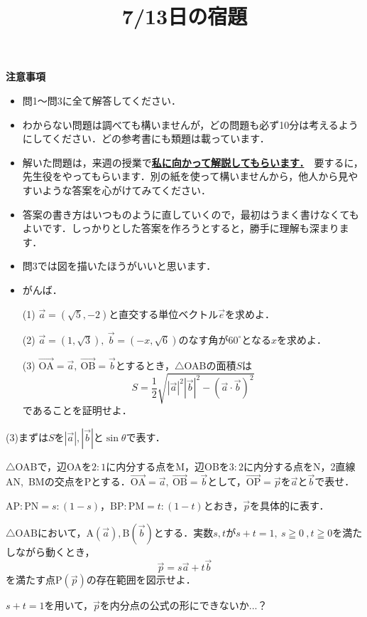 \documentclass[a4paper,11pt]{ltjarticle}
\title{}
\author{}
\date{}
\title{7/13日の宿題}
\author{}
\date{}
\begin{document}
\pagestyle{empty}
\maketitle
\centerline{\large{\textbf{注意事項}}}
\begin{itemize}
    \item 問1〜問3に全て解答してください．
    \item わからない問題は調べても構いませんが，どの問題も必ず10分は考えるようにしてください．どの参考書にも類題は載っています．
    \item 解いた問題は，来週の授業で\textbf{\underline{私に向かって解説してもらいます．}}　要するに，先生役をやってもらいます．別の紙を使って構いませんから，他人から見やすいような答案を心がけてみてください．
    \item 答案の書き方はいつものように直していくので，最初はうまく書けなくてもよいです．しっかりとした答案を作ろうとすると，勝手に理解も深まります．
    \item 問3では図を描いたほうがいいと思います．
    \item がんば．
\end{itemize}
\newpage
\begin{que}[：ベクトルの内積]
\begin{itemize}
    \item [(1)]$\overrightarrow{a}=(\sqrt5,-2)$と直交する単位ベクトル$\overrightarrow{e}$を求めよ．
     \item [(2)] $\overrightarrow{a}=(1,\sqrt3),~\overrightarrow{b}=(-x,\sqrt6)$のなす角が$60^\circ$となる$x$を求めよ．
     \item [(3)]$\overrightarrow{\mathrm{OA}}=\overrightarrow{a},~\overrightarrow{\mathrm{OB}}=\overrightarrow{b}$とするとき，$\triangle $OABの面積$S$は
     \[S=\frac12\sqrt{|\overrightarrow{a}|^2|\overrightarrow{b}|^2-(\overrightarrow{a}\cdot\overrightarrow{b})^2}\]
     であることを証明せよ．
\end{itemize}
\end{que}
(3)まずは$S$を$|\overrightarrow{a}|,|\overrightarrow{b}|$と$\sin\theta$で表す．
\ans
\newpage
\begin{que}[：点の存在範囲]
$\triangle$OABで，辺OAを$2:1$に内分する点をM，辺OBを$3:2$に内分する点をN，2直線AN,~BMの交点をPとする．$\overrightarrow{\text{OA}}=\overrightarrow{a},~\overrightarrow{\text{OB}}=\overrightarrow{b}$として，$\overrightarrow{\text{OP}}=\overrightarrow{p}$を$\overrightarrow{a}$と$\overrightarrow{b}$で表せ．
\end{que}
$\mathrm{AP}:\mathrm{PN}=s:(1-s)$，$\mathrm{BP}:\mathrm{PM}=t:(1-t)$とおき，$\overrightarrow{p}$を具体的に表す．
\ans\newpage
\begin{que}
    $\triangle \mathrm{OAB}$において，$\mathrm{A}(\overrightarrow{a}),\mathrm{B}(\overrightarrow{b})$とする．実数$s,t$が$s+t=1,~s\geqq0~,t\geqq0$を満たしながら動くとき，
    \[\overrightarrow{p}=s\overrightarrow{a}+t\overrightarrow{b}\]
    を満たす点$\mathrm{P}(\overrightarrow{p})$の存在範囲を図示せよ．
\end{que}
$s+t=1$を用いて，$\overrightarrow{p}$を内分点の公式の形にできないか...？
\ans
\end{document}
